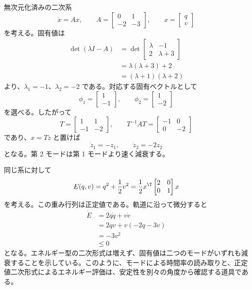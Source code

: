 \begin{example}[二次系のモードとエネルギー]
無次元化済みの二次系
\begin{equation}
  \dot{x}=Ax,\qquad
  A=
  \begin{bmatrix}
    0&1\\
    -2&-3
  \end{bmatrix},
  \qquad
  x=\begin{bmatrix}q\\v\end{bmatrix}
\end{equation}
を考える。固有値は
\begin{align}
  \det(\lambda I-A)
  &=
  \det
  \begin{bmatrix}
    \lambda&-1\\
    2&\lambda+3
  \end{bmatrix}\\
  &=\lambda(\lambda+3)+2\\
  &=(\lambda+1)(\lambda+2)
\end{align}
より、$\lambda_1=-1$、$\lambda_2=-2$ である。対応する固有ベクトルとして
\begin{equation}
  \phi_1=
  \begin{bmatrix}1\\-1\end{bmatrix},
  \qquad
  \phi_2=
  \begin{bmatrix}1\\-2\end{bmatrix}
\end{equation}
を選べる。したがって
\begin{equation}
  T=\begin{bmatrix}1&1\\-1&-2\end{bmatrix},
  \qquad
  T^{-1}AT=
  \begin{bmatrix}
    -1&0\\
    0&-2
  \end{bmatrix}
\end{equation}
であり、$x=Tz$ と置けば
\begin{equation}
  \dot{z}_1=-z_1,\qquad
  \dot{z}_2=-2z_2
\end{equation}
となる。第 2 モードは第 1 モードより速く減衰する。

同じ系に対して
\begin{equation}
  E(q,v)=q^2+\frac{1}{2}v^2
  =
  \frac{1}{2}x^\T
  \begin{bmatrix}
    2&0\\
    0&1
  \end{bmatrix}
  x
\end{equation}
を考える。この重み行列は正定値である。軌道に沿って微分すると
\begin{align}
  \dot{E}
  &=2q\dot{q}+v\dot{v}\\
  &=2qv+v(-2q-3v)\\
  &=-3v^2\\
  &\le0
\end{align}
となる。エネルギー型の二次形式は増えず、固有値は二つのモードがいずれも減衰することを示している。このように、モードによる時間率の読み取りと、正定値二次形式によるエネルギー評価は、安定性を別々の角度から確認する道具である。
\end{example}

